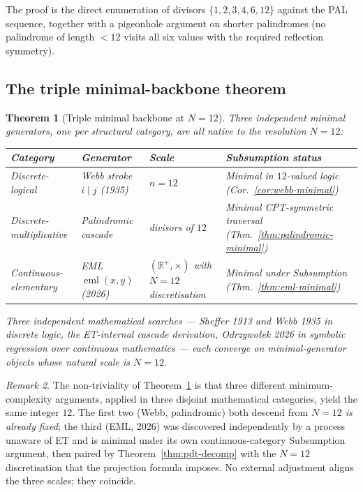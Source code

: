 \documentclass[11pt,a4paper]{article}
\newtheorem{theorem}{Theorem}[section]
\theoremstyle{definition}
\theoremstyle{remark}
\newtheorem{remark}[theorem]{Remark}
\newcommand{\R}{\mathbb{R}}
\begin{document}
The proof is the direct enumeration of divisors $\{1,2,3,4,6,12\}$ against the PAL sequence, together with a pigeonhole argument on shorter palindromes (no palindrome of length $<12$ visits all six values with the required reflection symmetry).

\subsection{The triple minimal-backbone theorem}\label{subsec:triple-backbone}

\begin{theorem}[Triple minimal backbone at $N=12$]\label{thm:triple-backbone}
Three independent minimal generators, one per structural category, are all native to the resolution $N=12$:
\begin{center}
\begin{tabularx}{\textwidth}{@{}lXlX@{}}
\toprule
Category & Generator & Scale & Subsumption status\\
\midrule
Discrete-logical & Webb stroke $i\mathbin{|}j$ (1935) & $n=12$ & Minimal in $12$-valued logic (Cor.~\ref{cor:webb-minimal})\\
Discrete-multiplicative & Palindromic cascade & divisors of $12$ & Minimal CPT-symmetric traversal (Thm.~\ref{thm:palindromic-minimal})\\
Continuous-elementary & EML $\operatorname{eml}(x,y)$ (2026) & $(\R^{+},\times)$ with $N=12$ discretisation & Minimal under Subsumption (Thm.~\ref{thm:eml-minimal})\\
\bottomrule
\end{tabularx}
\end{center}
Three independent mathematical searches --- Sheffer 1913 and Webb 1935 in discrete logic, the ET-internal cascade derivation, Odrzywołek 2026 in symbolic regression over continuous mathematics --- each converge on minimal-generator objects whose natural scale is $N=12$.
\end{theorem}

\begin{remark}
The non-triviality of Theorem~\ref{thm:triple-backbone} is that three different minimum-complexity arguments, applied in three disjoint mathematical categories, yield the same integer $12$. The first two (Webb, palindromic) both descend from \emph{$N=12$ is already fixed}; the third (EML, 2026) was discovered independently by a process unaware of ET and is minimal under its own continuous-category Subsumption argument, then paired by Theorem~\ref{thm:pdt-decomp} with the $N=12$ discretisation that the projection formula imposes. No external adjustment aligns the three scales; they coincide.
\end{remark}
\end{document}
